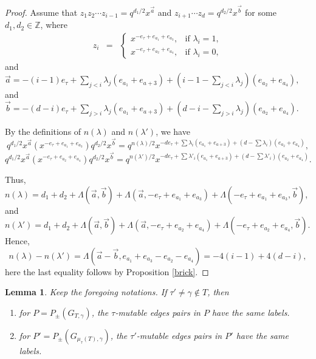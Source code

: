 \documentclass[10pt]{amsart}
\theoremstyle{theorems}
\newtheorem{Lemma}[Theorem]{Lemma}
\begin{document}
\begin{proof}

Assume that $z_1z_2\cdots z_{i-1}=q^{d_1/2}x^{\vec{a}}$ and $z_{i+1}\cdots z_{d}=q^{d_2/2}x^{\vec{b}}$ for some $d_1,d_2\in \mathbb Z$, where
\[\begin{array}{ccl} z_i &=&

         \left\{\begin{array}{ll}

             x^{-e_{\tau}+e_{a_1}+e_{a_3}}, &\mbox{if $\lambda_i=1$}, \\

             x^{-e_{\tau}+e_{a_2}+e_{a_4}}, &\mbox{if $\lambda_i=0$},

         \end{array}\right.

\end{array}\] and $\vec{a}=-(i-1)e_{\tau}+\sum_{j<i}\lambda_j(e_{a_1}+e_{a+3})+(i-1-\sum_{j<i}\lambda_j)(e_{a_2}+e_{a_4}),$ and
$\vec{b}=-(d-i)e_{\tau}+\sum_{j>i}\lambda_j(e_{a_1}+e_{a+3})+(d-i-\sum_{j>i}\lambda_j)(e_{a_2}+e_{a_4})$.

By the definitions of $n(\lambda)$ and $n(\lambda')$, we have $$q^{d_1/2}x^{\vec{a}}(x^{-e_{\tau}+e_{a_1}+e_{a_3}})q^{d_2/2}x^{\vec{b}}=q^{n(\lambda)/2}x^{-de_{\tau}+\sum\lambda_i(e_{a_1}+e_{a+3})+(d-\sum\lambda_i)(e_{a_2}+e_{a_4})},$$
$$q^{d_1/2}x^{\vec{a}}(x^{-e_{\tau}+e_{a_2}+e_{a_4}})q^{d_2/2}x^{\vec{b}}=q^{n(\lambda')/2}x^{-de_{\tau}+\sum\lambda'_i(e_{a_1}+e_{a+3})+(d-\sum\lambda'_i)(e_{a_2}+e_{a_4})}.$$

Thus, $n(\lambda)=d_1+d_2+\Lambda(\vec{a}, \vec{b})+\Lambda(\vec{a}, -e_{\tau}+e_{a_1}+e_{a_3})+\Lambda(-e_{\tau}+e_{a_1}+e_{a_3},\vec{b})$, and $n(\lambda')=d_1+d_2+\Lambda(\vec{a}, \vec{b})+\Lambda(\vec{a}, -e_{\tau}+e_{a_2}+e_{a_4})+\Lambda(-e_{\tau}+e_{a_2}+e_{a_4},\vec{b})$. Hence,
$$n(\lambda)-n(\lambda')=\Lambda(\vec{a}-\vec{b}, e_{a_1}+e_{a_3}-e_{a_2}-e_{a_4})=-4(i-1)+4(d-i),$$
here the last equality follows by Proposition \ref{brick}.
\end{proof}

\medskip

\begin{Lemma}\label{minmax}
Keep the foregoing notations. If $\tau'\neq \gamma\notin T$, then

\begin{enumerate}[$(1)$]

  \item for $P=P_{\pm}(G_{T,\gamma})$, the $\tau$-mutable edges pairs in $P$ have the same labels.

  \item for $P'=P_{\pm}(G_{\mu_{\tau}(T),\gamma})$, the $\tau'$-mutable edges pairs in $P'$ have the same labels.

\end{enumerate}

\end{Lemma}
\end{document}
